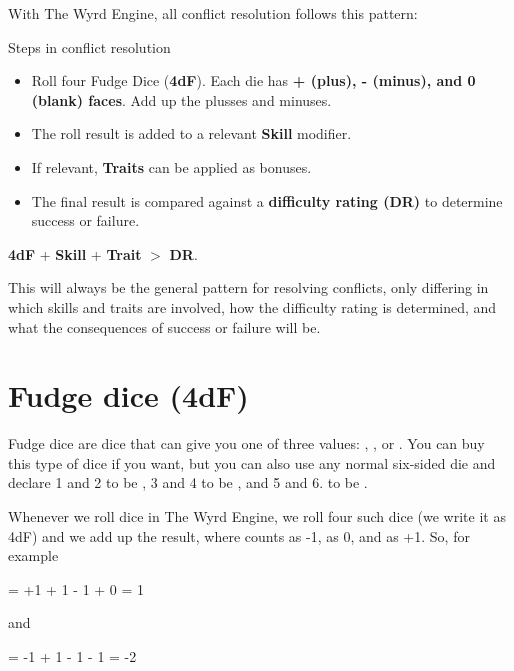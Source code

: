 With The Wyrd Engine, all conflict resolution follows this pattern:

\begin{DndReadAloud}{Steps in conflict resolution}
	\begin{itemize}
		\item Roll four Fudge Dice (\textbf{4dF}).
		      Each die has \textbf{+ (plus), - (minus), and 0 (blank) faces}. Add up the plusses and minuses.
		\item The roll result is added to a relevant \textbf{Skill} modifier.
		\item If relevant, \textbf{Traits} can be applied as bonuses.
		\item The final result is compared against a \textbf{difficulty rating (DR)} to determine success or failure.
	\end{itemize}
	\begin{center}
		\textbf{4dF} + \textbf{Skill} + \textbf{Trait} $>$ \textbf{DR}.	
	\end{center}
\end{DndReadAloud}

This will always be the general pattern for resolving conflicts, only differing in which skills and traits are involved, how the difficulty rating is determined, and what the consequences of success or failure will be.

\section{Fudge dice (4dF)}

Fudge dice are dice that can give you one of three values: \FudgeDie{-}, \FudgeDie{}, or \FudgeDie{+}. You can buy this type of dice if you want, but you can also use any normal six-sided die and declare 1 and 2 to be \FudgeDie{-}, 3 and 4 to be \FudgeDie{}, and 5 and 6. to be \FudgeDie{+}.

Whenever we roll dice in The Wyrd Engine, we roll four such dice (we write it as 4dF) and we add up the result, where \FudgeDie{-} counts as -1, \FudgeDie{} as 0, and \FudgeDie{+} as +1. So, for example
\begin{center}
	\FudgeRes{+}{+}{-}{} = +1 + 1 - 1 + 0 = 1
\end{center}
\noindent and 
\begin{center}
	\FudgeRes{-}{+}{-}{-} = -1 + 1 - 1 - 1 = -2
\end{center}

